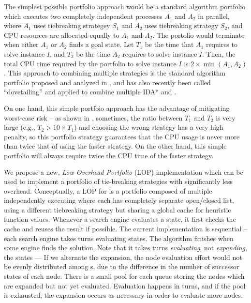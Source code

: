 The simplest possible portfolio approach would be a standard algorithm portfolio
which executes two completely independent \astar processes $A_1$ and $A_2$ in parallel, where $A_1$ uses tiebreaking strategey $S_1$ and $A_2$ uses tiebreaking strategy $S_2$, and CPU resources are allocated equally to $A_1$ and $A_2$.
The portolio would terminate when either $A_1$ or $A_2$ finds a goal state.
Let $T_1$ be the time that $A_1$ requires to solve instance $I$, and $T_2$ be the
time $A_2$ requires to solve instance $I$. Then, the total CPU time
required by the portfolio to solve instance $I$ is $2\times\min(A_1,A_2)$. This approach to combining multiple strategies is the standard algorithm portfolio proposed and analyzed in \cite{HubermanLH97,GomesS01}, and has also recently been called ``dovetailing'' and applied to combine multiple IDA* and \astar  \cite{ValenzanoSSBK10}. %

On one hand, this simple portfoio approach has the advantage of mitigating worst-case risk -- as shown in , sometimes, the ratio between $T_1$ and $T_2$ is very large (e.g., $T_2 > 10\times T_1$) and choosing the wrong strategy has a very high penalty, so this portfolio strategy guarantees that the CPU usage is never more than twice that of using the faster strategy.
On the other hand, this simple portfolio will always require twice the
CPU time of the faster strategy.

We propose a new, \emph{Low-Overhead Portfolio} (LOP) implementation which can be used to implement a portfolio of tie-breaking strategies with significantly less overhead.
% 
Conceptually, a LOP for \astar is a portfolio composed of multiple
independently executing \astar where each \astar has completely separate
open/closed list, using a different tiebreaking strategy but sharing a
global cache for heuristic function values. Whenever a search engine
evaluates a state, it first checks the cache and reuses the result if
possible.  The current implementation is sequential -- each search
engine takes turns evaluating states. The algorithm finishes when some
engine finds the solution. Note that it takes turns \emph{evaluating}, not
\emph{expanding}, the states --- If we alternate the expansion, 
the node evaluation effort would not be evenly
distributed among \astar{}s, due to the difference in the number of
successor states of each node. There is a small pool for each queue
storing the nodes which are expanded
but not yet evaluated. Evaluation happens in turns, and if the pool is
exhausted, the expansion occurs as necessary in order to evaluate
more nodes.

